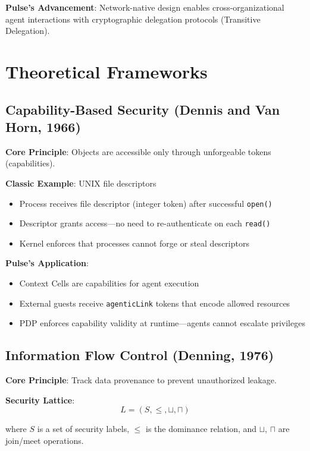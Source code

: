 \textbf{Pulse's Advancement}: Network-native design enables cross-organizational agent interactions with cryptographic delegation protocols (Transitive Delegation).

\section{Theoretical Frameworks}

\subsection{Capability-Based Security (Dennis and Van Horn, 1966)}

\textbf{Core Principle}: Objects are accessible only through unforgeable tokens (capabilities).

\textbf{Classic Example}: UNIX file descriptors
\begin{itemize}
    \item Process receives file descriptor (integer token) after successful \texttt{open()}
    \item Descriptor grants access—no need to re-authenticate on each \texttt{read()}
    \item Kernel enforces that processes cannot forge or steal descriptors
\end{itemize}

\textbf{Pulse's Application}:
\begin{itemize}
    \item Context Cells are capabilities for agent execution
    \item External guests receive \texttt{agenticLink} tokens that encode allowed resources
    \item PDP enforces capability validity at runtime—agents cannot escalate privileges
\end{itemize}

\subsection{Information Flow Control (Denning, 1976)}

\textbf{Core Principle}: Track data provenance to prevent unauthorized leakage.

\textbf{Security Lattice}:
\[
L = (S, \leq, \sqcup, \sqcap)
\]

where $S$ is a set of security labels, $\leq$ is the dominance relation, and $\sqcup$, $\sqcap$ are join/meet operations.

